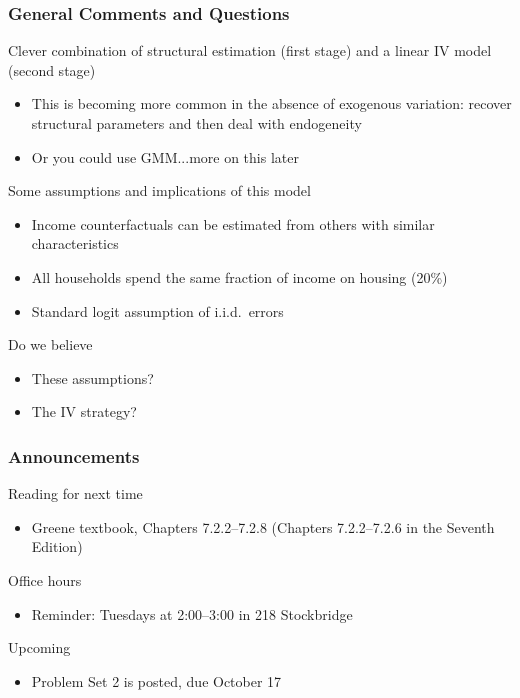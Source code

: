 \documentclass{beamer}
\begin{document}
\begin{frame}\frametitle{General Comments and Questions}
    Clever combination of structural estimation (first stage) and a linear IV model (second stage)
    \begin{itemize}
      \item This is becoming more common in the absence of exogenous variation: recover structural parameters and then deal with endogeneity
      \item Or you could use GMM...more on this later
    \end{itemize}
    \vspace{2ex}
    Some assumptions and implications of this model
    \begin{itemize}
      \item Income counterfactuals can be estimated from others with similar characteristics
      \item All households spend the same fraction of income on housing (20\%)
      \item Standard logit assumption of i.i.d.\ errors
    \end{itemize}
    \vspace{2ex}
    Do we believe
    \begin{itemize}
      \item These assumptions?
      \item The IV strategy?
    \end{itemize}
\end{frame}

\begin{frame}\frametitle{Announcements}
    Reading for next time
    \begin{itemize}
        \item Greene textbook, Chapters 7.2.2--7.2.8 (Chapters 7.2.2--7.2.6 in the Seventh Edition)
    \end{itemize}
    \vspace{3ex}
    Office hours
    \begin{itemize}
        \item Reminder: Tuesdays     at 2:00--3:00 in 218 Stockbridge
    \end{itemize}
    \vspace{3ex}
    Upcoming
    \begin{itemize}
        \item Problem Set 2 is posted, due October 17
    \end{itemize}
\end{frame}
\end{document}

